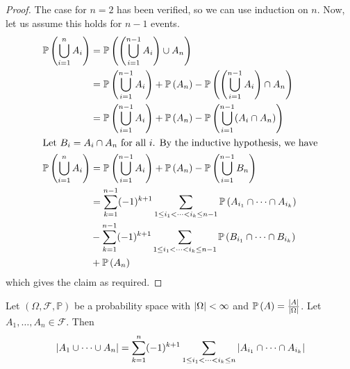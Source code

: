 \begin{proof}
	The case for \(n=2\) has been verified, so we can use induction on \(n\).
	Now, let us assume this holds for \(n-1\) events.
	\begin{align*}
		\mathbb{P}\left({\bigcup_{i=1}^n A_i}\right) & = \mathbb{P}\left({\left( \bigcup_{i=1}^{n-1} A_i  \right) \cup A_n}\right)                                                     \\
		                           & = \mathbb{P}\left({\bigcup_{i=1}^{n-1} A_i}\right) + \mathbb{P}\left({A_n}\right) - \mathbb{P}\left({\left( \bigcup_{i=1}^{n-1} A_i  \right) \cap A_n}\right)       \\
		                           & = \mathbb{P}\left({\bigcup_{i=1}^{n-1} A_i}\right) + \mathbb{P}\left({A_n}\right) - \mathbb{P}\left({\bigcup_{i=1}^{n-1} (A_i \cap A_n)}\right)                     \\
		\intertext{Let \(B_i = A_i \cap A_n\) for all \(i\).
			By the inductive hypothesis, we have}
		\mathbb{P}\left({\bigcup_{i=1}^n A_i}\right) & = \mathbb{P}\left({\bigcup_{i=1}^{n-1} A_i}\right) + \mathbb{P}\left({A_n}\right) - \mathbb{P}\left({\bigcup_{i=1}^{n-1} B_n}\right)                                \\
		                           & = \sum_{k=1}^{n-1} (-1)^{k+1} \sum_{1 \leq i_1 < \dots < i_k \leq n-1} \mathbb{P}\left({A_{i_1} \cap \dots \cap A_{i_k}}\right) \\
		                           & - \sum_{k=1}^{n-1} (-1)^{k+1} \sum_{1 \leq i_1 < \dots < i_k \leq n-1} \mathbb{P}\left({B_{i_1} \cap \dots \cap B_{i_k}}\right) \\
		                           & + \mathbb{P}\left({A_n}\right)
	\end{align*}
	which gives the claim as required.
\end{proof}

Let \((\Omega, \mathcal F, \mathbb P)\) be a probability space with \(\abs{\Omega} < \infty\) and \(\mathbb{P}\left({A}\right) = \frac{\abs{A}}{\abs{\Omega}}\).
Let \(A_1, \dots, A_n \in \mathcal F\).
Then
\[
	\abs{A_1 \cup \dots \cup A_n} = \sum_{k=1}^n (-1)^{k+1} \sum_{1 \leq i_1 < \dots < i_k \leq n} \abs{A_{i_1} \cap \dots \cap A_{i_k}}
\]

